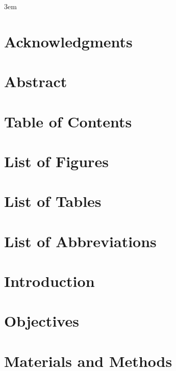 \documentclass[10pt,twoside]{book}
\begin{document}
\emergencystretch 3em

\frontmatter



\chapter{Acknowledgments}

\clearpage

\chapter{Abstract}

\clearpage

\chapter{Table of Contents}
\tableofcontents %
\clearpage

\chapter{List of Figures}
\listoffigures
\clearpage

\chapter{List of Tables}
\listoftables
\clearpage

\chapter{List of Abbreviations}

\clearpage

\mainmatter

\chapter{Introduction}
\clearpage


\clearpage

\chapter{Objectives}
\clearpage


\clearpage

\chapter{Materials and Methods}
\clearpage
\end{document}
